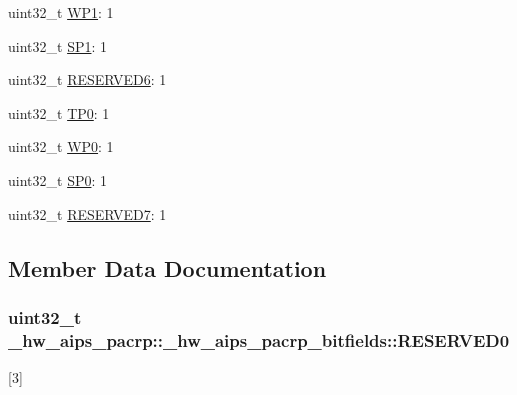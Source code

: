 \begin{DoxyCompactItemize}
\item 
uint32\+\_\+t \hyperlink{struct__hw__aips__pacrp_1_1__hw__aips__pacrp__bitfields_ac91209f23d35b8b48caa68b9b031c29b}{W\+P1}\+: 1
\item 
uint32\+\_\+t \hyperlink{struct__hw__aips__pacrp_1_1__hw__aips__pacrp__bitfields_adf9ba089e8ec26ee48afae027ae6e99f}{S\+P1}\+: 1
\item 
uint32\+\_\+t \hyperlink{struct__hw__aips__pacrp_1_1__hw__aips__pacrp__bitfields_a9b8b69c0a355af3f021bc21e0fd24bb3}{R\+E\+S\+E\+R\+V\+E\+D6}\+: 1
\item 
uint32\+\_\+t \hyperlink{struct__hw__aips__pacrp_1_1__hw__aips__pacrp__bitfields_a5cc81cc20229afadead1da5f75bd5e9c}{T\+P0}\+: 1
\item 
uint32\+\_\+t \hyperlink{struct__hw__aips__pacrp_1_1__hw__aips__pacrp__bitfields_a43e0d408a19df414aa6140b1b980f154}{W\+P0}\+: 1
\item 
uint32\+\_\+t \hyperlink{struct__hw__aips__pacrp_1_1__hw__aips__pacrp__bitfields_a85e29a0faff7dcc4d044b68f3da717b6}{S\+P0}\+: 1
\item 
uint32\+\_\+t \hyperlink{struct__hw__aips__pacrp_1_1__hw__aips__pacrp__bitfields_a3fa92f3dbb8ca971452b9bcae8d469da}{R\+E\+S\+E\+R\+V\+E\+D7}\+: 1
\end{DoxyCompactItemize}


\subsection{Member Data Documentation}
\subsubsection[{\texorpdfstring{R\+E\+S\+E\+R\+V\+E\+D0}{RESERVED0}}]{\setlength{\rightskip}{0pt plus 5cm}uint32\+\_\+t \+\_\+hw\+\_\+aips\+\_\+pacrp\+::\+\_\+hw\+\_\+aips\+\_\+pacrp\+\_\+bitfields\+::\+R\+E\+S\+E\+R\+V\+E\+D0}\hypertarget{struct__hw__aips__pacrp_1_1__hw__aips__pacrp__bitfields_a97af2a05a4e3322226e520adbe61d14b}{}\label{struct__hw__aips__pacrp_1_1__hw__aips__pacrp__bitfields_a97af2a05a4e3322226e520adbe61d14b}
\mbox{[}3\mbox{]} 
